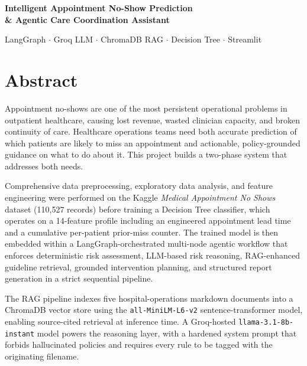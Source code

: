 \documentclass[11pt,a4paper]{article}
\begin{document}
\begin{center}
\vspace*{0.2in}
{\fontsize{26}{30}\selectfont\color{navy}\bfseries
Intelligent Appointment No-Show Prediction \\[2pt]
\& Agentic Care Coordination Assistant \par}
\vspace{10pt}
{\normalsize\color{black!70}
LangGraph\; $\cdot$\; Groq LLM\; $\cdot$\; ChromaDB RAG\; $\cdot$\; Decision Tree\; $\cdot$\; Streamlit
\par}
\end{center}
\vspace{12pt}

\section*{\color{navy}Abstract}
\vspace{8pt}

Appointment no-shows are one of the most persistent operational problems in
outpatient healthcare, causing lost revenue, wasted clinician capacity, and
broken continuity of care. Healthcare operations teams need both accurate
prediction of which patients are likely to miss an appointment and
actionable, policy-grounded guidance on what to do about it. This project
builds a two-phase system that addresses both needs.

Comprehensive data preprocessing, exploratory data analysis, and feature
engineering were performed on the Kaggle \emph{Medical Appointment No Shows}
dataset (110{,}527 records) before training a Decision Tree classifier,
which operates on a 14-feature profile including an engineered appointment
lead time and a cumulative per-patient prior-miss counter. The trained model
is then embedded within a LangGraph-orchestrated multi-node agentic workflow
that enforces deterministic risk assessment, LLM-based risk reasoning,
RAG-enhanced guideline retrieval, grounded intervention planning, and
structured report generation in a strict sequential pipeline.

The RAG pipeline indexes five hospital-operations markdown documents into a
ChromaDB vector store using the \texttt{all-MiniLM-L6-v2} sentence-transformer
model, enabling source-cited retrieval at inference time. A Groq-hosted
\texttt{llama-3.1-8b-instant} model powers the reasoning layer, with a
hardened system prompt that forbids hallucinated policies and requires every
rule to be tagged with the originating filename.
\end{document}
